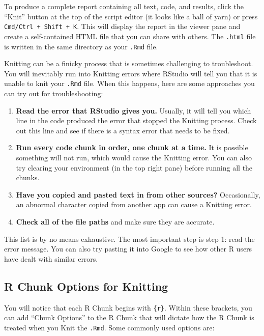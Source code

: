 \documentclass[
]{book}
\providecommand{\tightlist}{%
  \setlength{\itemsep}{0pt}\setlength{\parskip}{0pt}}
\begin{document}
To produce a complete report containing all text, code, and results, click the ``Knit'' button at the top of the script editor (it looks like a ball of yarn) or press \texttt{Cmd/Ctrl\ +\ Shift\ +\ K}. This will display the report in the viewer pane and create a self-contained HTML file that you can share with others. The \texttt{.html} file is written in the same directory as your \texttt{.Rmd} file.

Knitting can be a finicky process that is sometimes challenging to troubleshoot. You will inevitably run into Knitting errors where RStudio will tell you that it is unable to knit your \texttt{.Rmd} file. When this happens, here are some approaches you can try out for troubleshooting:

\begin{enumerate}
\def\labelenumi{\arabic{enumi}.}
\tightlist
\item
  \textbf{Read the error that RStudio gives you.} Usually, it will tell you which line in the code produced the error that stopped the Knitting process. Check out this line and see if there is a syntax error that needs to be fixed.
\item
  \textbf{Run every code chunk in order, one chunk at a time.} It is possible something will not run, which would cause the Knitting error. You can also try clearing your environment (in the top right pane) before running all the chunks.
\item
  \textbf{Have you copied and pasted text in from other sources?} Occasionally, an abnormal character copied from another app can cause a Knitting error.
\item
  \textbf{Check all of the file paths} and make sure they are accurate.
\end{enumerate}

This list is by no means exhaustive. The most important step is step 1: read the error message. You can also try pasting it into Google to see how other R users have dealt with similar errors.

\hypertarget{r-chunk-options-for-knitting}{%
\subsection{R Chunk Options for Knitting}\label{r-chunk-options-for-knitting}}

You will notice that each R Chunk begins with \texttt{\{r\}}. Within these brackets, you can add ``Chunk Options'' to the R Chunk that will dictate how the R Chunk is treated when you Knit the \texttt{.Rmd}. Some commonly used options are:
\end{document}

